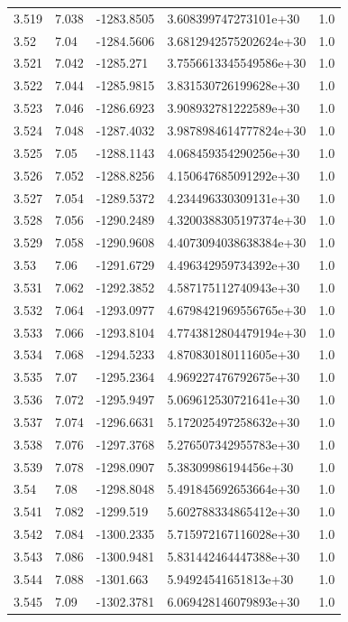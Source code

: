 \begin{tabular}{lllll}
3.519 & 7.038 & -1283.8505 & 3.608399747273101e+30 & 1.0 \\
3.52 & 7.04 & -1284.5606 & 3.6812942575202624e+30 & 1.0 \\
3.521 & 7.042 & -1285.271 & 3.7556613345549586e+30 & 1.0 \\
3.522 & 7.044 & -1285.9815 & 3.831530726199628e+30 & 1.0 \\
3.523 & 7.046 & -1286.6923 & 3.908932781222589e+30 & 1.0 \\
3.524 & 7.048 & -1287.4032 & 3.9878984614777824e+30 & 1.0 \\
3.525 & 7.05 & -1288.1143 & 4.068459354290256e+30 & 1.0 \\
3.526 & 7.052 & -1288.8256 & 4.150647685091292e+30 & 1.0 \\
3.527 & 7.054 & -1289.5372 & 4.234496330309131e+30 & 1.0 \\
3.528 & 7.056 & -1290.2489 & 4.3200388305197374e+30 & 1.0 \\
3.529 & 7.058 & -1290.9608 & 4.4073094038638384e+30 & 1.0 \\
3.53 & 7.06 & -1291.6729 & 4.496342959734392e+30 & 1.0 \\
3.531 & 7.062 & -1292.3852 & 4.587175112740943e+30 & 1.0 \\
3.532 & 7.064 & -1293.0977 & 4.6798421969556765e+30 & 1.0 \\
3.533 & 7.066 & -1293.8104 & 4.7743812804479194e+30 & 1.0 \\
3.534 & 7.068 & -1294.5233 & 4.870830180111605e+30 & 1.0 \\
3.535 & 7.07 & -1295.2364 & 4.969227476792675e+30 & 1.0 \\
3.536 & 7.072 & -1295.9497 & 5.069612530721641e+30 & 1.0 \\
3.537 & 7.074 & -1296.6631 & 5.172025497258632e+30 & 1.0 \\
3.538 & 7.076 & -1297.3768 & 5.276507342955783e+30 & 1.0 \\
3.539 & 7.078 & -1298.0907 & 5.38309986194456e+30 & 1.0 \\
3.54 & 7.08 & -1298.8048 & 5.491845692653664e+30 & 1.0 \\
3.541 & 7.082 & -1299.519 & 5.602788334865412e+30 & 1.0 \\
3.542 & 7.084 & -1300.2335 & 5.715972167116028e+30 & 1.0 \\
3.543 & 7.086 & -1300.9481 & 5.831442464447388e+30 & 1.0 \\
3.544 & 7.088 & -1301.663 & 5.94924541651813e+30 & 1.0 \\
3.545 & 7.09 & -1302.3781 & 6.069428146079893e+30 & 1.0 \\

\end{tabular}
